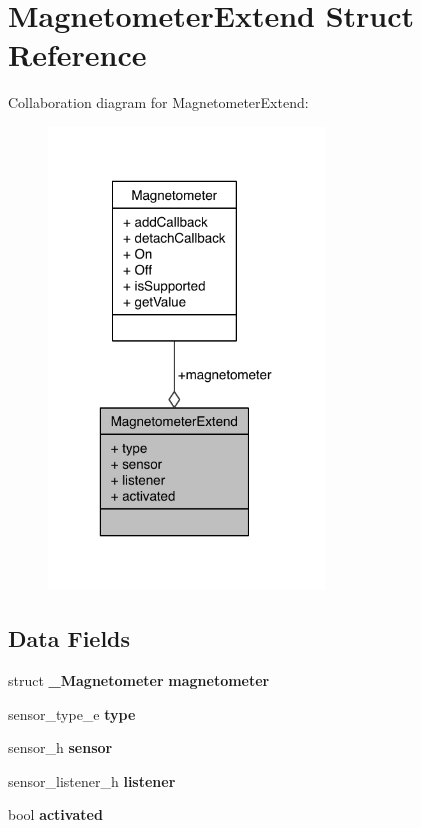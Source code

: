 \section{Magnetometer\-Extend Struct Reference}
\label{structMagnetometerExtend}


Collaboration diagram for Magnetometer\-Extend\-:\nopagebreak
\begin{figure}[H]
\begin{center}
\leavevmode
\includegraphics[width=208pt]{structMagnetometerExtend__coll__graph}
\end{center}
\end{figure}
\subsection*{Data Fields}
\begin{DoxyCompactItemize}
\item 
struct {\bf \-\_\-\-Magnetometer} {\bfseries magnetometer}\label{structMagnetometerExtend_a17af838bb14cdb37496b7f9af4edfeae}

\item 
sensor\-\_\-type\-\_\-e {\bfseries type}\label{structMagnetometerExtend_abf66a10052381ab8d323cb3e3b971602}

\item 
sensor\-\_\-h {\bfseries sensor}\label{structMagnetometerExtend_a7e724ca6dfd68242fa0f6e4acf825f98}

\item 
sensor\-\_\-listener\-\_\-h {\bfseries listener}\label{structMagnetometerExtend_abcb76504bf1dc981b51456182312564f}

\item 
bool {\bfseries activated}\label{structMagnetometerExtend_aed95926c2ba46526f10fadb3ec7c4e0c}

\end{DoxyCompactItemize}


